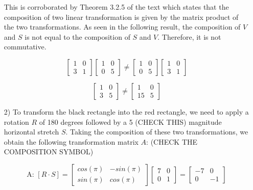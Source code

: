 \documentclass[10pt]{article}
\begin{document}
\begin{enumerate}[leftmargin=\labelsep]
    This is corroborated by Theorem 3.2.5 of the text which states that the composition of two linear transformation is given by the matrix product of the two transformations. As seen in the following result, the composition of $V$ and $S$ is not equal to the composition of $S$ and $V$. Therefore, it is not commutative.
    
    \begin{equation}
        \begin{bmatrix} 
            1 & 0 \\ 3 & 1 
        \end{bmatrix}
        \begin{bmatrix} 
            1 & 0 \\ 0 & 5 
        \end{bmatrix}
        \neq
        \begin{bmatrix}
            1 & 0 \\ 0 & 5 
        \end{bmatrix} 
        \begin{bmatrix} 
            1 & 0 \\ 
            3 & 1 
        \end{bmatrix}
    \end{equation}
    
    \begin{equation}
        \begin{bmatrix}
            1 & 0 \\
            3 & 5
        \end{bmatrix}
        \neq
        \begin{bmatrix}
            1 & 0 \\
            15 & 5
        \end{bmatrix}
    \end{equation}

    \item[2)] To transform the black rectangle into the red rectangle, we need to apply a rotation $R$ of 180 degrees followed by a 5 (CHECK THIS) magnitude horizontal stretch $S$. Taking the composition of these two transformations, we obtain the following transformation matrix $A$: (CHECK THE COMPOSITION SYMBOL)

    \[ \text{A: } [R \cdot S]
    = 
    \begin{bmatrix}
        cos(\pi) & -sin(\pi) \\
        sin(\pi) & cos(\pi)
    \end{bmatrix} 
    \begin{bmatrix}
        7 & 0 \\
        0 & 1
    \end{bmatrix} 
    = 
    \begin{bmatrix}
        -7 & 0 \\
        0 & -1
    \end{bmatrix} \]
\end{enumerate}
\end{document}
